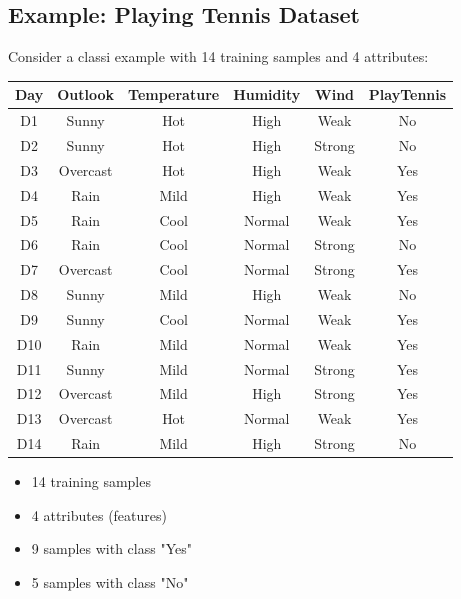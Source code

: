 \documentclass[a4paper]{article}
\theoremstyle{definition}
\begin{document}
\subsection{Example: Playing Tennis Dataset}
Consider a classi example with 14 training samples and 4 attributes:
\begin{center}
    \begin{tabular}{ |c|c|c|c|c|c| }
        \hline 
        \textbf{Day} & \textbf{Outlook} & \textbf{Temperature} & \textbf{Humidity} & \textbf{Wind} & \textbf{PlayTennis} \\
        \hline
        D1 & Sunny & Hot & High & Weak & No \\
        \hline
        D2 & Sunny & Hot & High & Strong & No \\
        \hline 
        D3 & Overcast & Hot & High & Weak & Yes \\
        \hline 
        D4 & Rain & Mild & High & Weak & Yes \\
        \hline 
        D5 & Rain & Cool & Normal & Weak & Yes \\
        \hline 
        D6 & Rain & Cool & Normal & Strong & No \\
        \hline
        D7 & Overcast & Cool & Normal & Strong & Yes \\ 
        \hline
        D8 & Sunny & Mild & High & Weak & No \\
        \hline
        D9 & Sunny & Cool & Normal & Weak & Yes \\
        \hline 
        D10 & Rain & Mild & Normal & Weak & Yes \\
        \hline 
        D11 & Sunny & Mild & Normal & Strong & Yes \\ 
        \hline 
        D12 & Overcast & Mild & High & Strong & Yes \\
        \hline 
        D13 & Overcast & Hot & Normal & Weak & Yes \\
        \hline 
        D14 & Rain & Mild & High & Strong & No \\
        \hline 
    \end{tabular}
\end{center}
\begin{itemize}
    \item 14 training samples 
    \item 4 attributes (features) 
    \item 9 samples with class "Yes"
    \item 5 samples with class "No"
\end{itemize}
\end{document}
